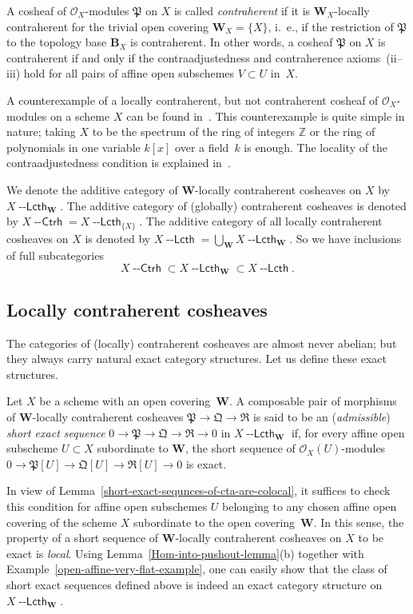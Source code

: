 \documentclass[12pt,a4paper]{amsart}
\newcommand{\+}{\nobreakdash-}
\renewcommand{\:}{\colon}
\newcommand{\rarrow}{\longrightarrow}
\newcommand{\Ctrh}{{\operatorname{\mathsf{--Ctrh}}}}
\newcommand{\Lcth}{{\operatorname{\mathsf{--Lcth}}}}
\newcommand{\bB}{\mathbf B}
\newcommand{\bW}{\mathbf W}
\newcommand{\cO}{\mathcal O}
\newcommand{\fP}{\mathfrak P}
\newcommand{\fQ}{\mathfrak Q}
\newcommand{\fR}{\mathfrak R}
\newcommand{\boZ}{\mathbb Z}
\theoremstyle{plain}
\theoremstyle{definition}
\begin{document}
 A cosheaf of $\cO_X$\+modules $\fP$ on $X$ is called
\emph{contraherent} if it is $\bW_X$\+locally contraherent for
the trivial open covering $\bW_X=\{X\}$, i.~e., if the restriction
of $\fP$ to the topology base $\bB_X$ is contraherent.
 In other words, a cosheaf $\fP$ on $X$ is contraherent if and only if
the contraadjustedness and contraherence axioms~(ii\+-iii) hold
for all pairs of affine open subschemes $V\subset U$ in~$X$.

 A counterexample of a locally contraherent, but not contraherent
cosheaf of $\cO_X$\+modules on a scheme $X$ can be found
in~\cite[Example~3.2.1]{Pcosh}.
 This counterexample is quite simple in nature; taking $X$ to be
the spectrum of the ring of integers $\boZ$ or the ring of polynomials
in one variable $k[x]$ over a field~$k$ is enough.
 The locality of the contraadjustedness condition is explained
in~\cite[paragraph after Example~3.2.1]{Pcosh}.

 We denote the additive category of $\bW$\+locally contraherent
cosheaves on $X$ by $X\Lcth_\bW$.
 The additive category of (globally) contraherent cosheaves is
denoted by $X\Ctrh=X\Lcth_{\{X\}}$.
 The additive category of all locally contraherent cosheaves on $X$
is denoted by $X\Lcth=\bigcup_\bW X\Lcth_\bW$.
 So we have inclusions of full subcategories
$$
 X\Ctrh\subset X\Lcth_\bW\subset X\Lcth.
$$

\subsection{Locally contraherent cosheaves}
 The categories of (locally) contraherent cosheaves are almost never
abelian; but they always carry natural exact category structures.
 Let us define these exact structures.

 Let $X$ be a scheme with an open covering~$\bW$.
 A composable pair of morphisms of $\bW$\+locally contraherent cosheaves
$\fP\rarrow\fQ\rarrow\fR$ is said to be an (\emph{admissible})
\emph{short exact sequence} $0\rarrow\fP\rarrow\fQ\rarrow\fR\rarrow0$
in $X\Lcth_\bW$ if, for every affine open subscheme $U\subset X$
subordinate to $\bW$, the short sequence of $\cO_X(U)$\+modules
$0\rarrow\fP[U]\rarrow\fQ[U]\rarrow\fR[U]\rarrow0$ is exact.

 In view of Lemma~\ref{short-exact-sequnces-of-cta-are-colocal}, it
suffices to check this condition for affine open subschemes $U$
belonging to any chosen affine open covering of the scheme $X$
subordinate to the open covering~$\bW$.
 In this sense, the property of a short sequence of $\bW$\+locally
contraherent cosheaves on $X$ to be exact is \emph{local}.
 Using Lemma~\ref{Hom-into-pushout-lemma}(b) together with
Example~\ref{open-affine-very-flat-example}, one can easily show
that the class of short exact sequences defined above is indeed
an exact category structure on $X\Lcth_\bW$.
\end{document}
